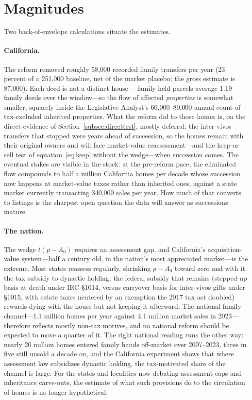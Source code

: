 \documentclass[12pt, letterpaper]{article}
\begin{document}
\section{Magnitudes}\label{sec:magnitudes}

Two back-of-envelope calculations situate the estimates.

\paragraph{California.} The reform removed roughly 58,000 recorded family
transfers per year (23 percent of a 251,000 baseline, net of the market
placebo; the gross estimate is 87,000). Each deed is not a distinct house
---family-held parcels average 1.19 family deeds over the window---so the
flow of affected \emph{properties} is somewhat smaller, squarely inside the
Legislative Analyst's 60,000--80,000 annual count of tax-excluded inherited
properties. What the reform did to those homes is, on the direct evidence of
Section~\ref{subsec:directtest}, mostly deferral: the inter-vivos transfers that stopped were
years ahead of succession, so the homes remain with their original owners
and will face market-value reassessment---and the keep-or-sell test of
equation~\eqref{eq:keep} without the wedge---when succession comes. The
eventual stakes are visible in the stock: at the pre-reform pace, the
eliminated flow compounds to half a million California homes per decade
whose succession now happens at market-value taxes rather than inherited
ones, against a state market currently transacting 340,000 sales per year.
How much of that converts to listings is the sharpest open question the
data will answer as successions mature.

\paragraph{The nation.} The wedge $t(p - A_0)$ requires an assessment gap,
and California's acquisition-value system---half a century old, in the
nation's most appreciated market---is the extreme. Most states reassess
regularly, shrinking $p - A_0$ toward zero and with it the tax subsidy to
dynastic holding; the federal subsidy that remains (stepped-up basis at death
under IRC \S1014, versus carryover basis for inter-vivos gifts under \S1015,
with estate taxes neutered by an exemption the 2017 tax act doubled) rewards
dying with the house but not keeping it afterward. The national family
channel---1.1 million homes per year against 4.1 million market sales in
2023---therefore reflects mostly non-tax motives, and no national reform
should be expected to move a quarter of it. The right national reading runs
the other way: nearly 20 million homes entered family hands off-market over
2007--2023, three in five still unsold a decade on, and the California
experiment shows that where assessment law subsidizes dynastic holding, the
tax-motivated share of the channel is large. For the states and localities
now debating assessment caps and inheritance carve-outs, the estimate of
what such provisions do to the circulation of homes is no longer
hypothetical.
\end{document}
